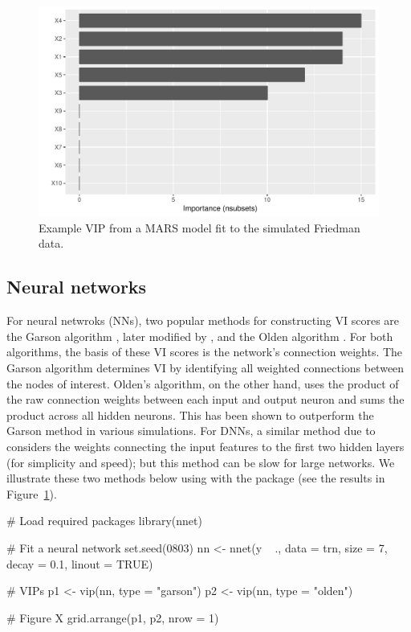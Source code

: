\begin{figure}[!htb]
  \centering 
  \includegraphics[width=1\linewidth]{figures/vip-earth} 
  \caption{Example VIP from a MARS model fit to the simulated Friedman data.}
  \label{fig:vip-earth}
\end{figure}

\subsection{Neural networks}

For neural netwroks (NNs), two popular methods for constructing VI scores are the Garson algorithm \citep{interpreting-garson-1991}, later modified by \citet{back-goh-1995}, and the Olden algorithm \citep{accurate-olden-2004}. For both algorithms, the basis of these VI scores is the network’s connection weights. The Garson algorithm determines VI by identifying all weighted connections between the nodes of interest. Olden’s algorithm, on the other hand, uses the product of the raw connection weights between each input and output neuron and sums the product across all hidden neurons. This has been shown to outperform the Garson method in various simulations. For DNNs, a similar method due to \citet{data-gedeon-1997} considers the weights connecting the input features to the first two hidden layers (for simplicity and speed); but this method can be slow for large networks. We illustrate these two methods below using  with the  package \citep{nnet-pkg} (see the results in Figure~\ref{fig:vip-earth}).

\begin{example}
# Load required packages
library(nnet)

# Fit a neural network
set.seed(0803)
nn <- nnet(y ~ ., data = trn, size = 7, decay = 0.1, linout = TRUE)

# VIPs
p1 <- vip(nn, type = "garson")
p2 <- vip(nn, type = "olden")

# Figure X
grid.arrange(p1, p2, nrow = 1)
\end{example}


